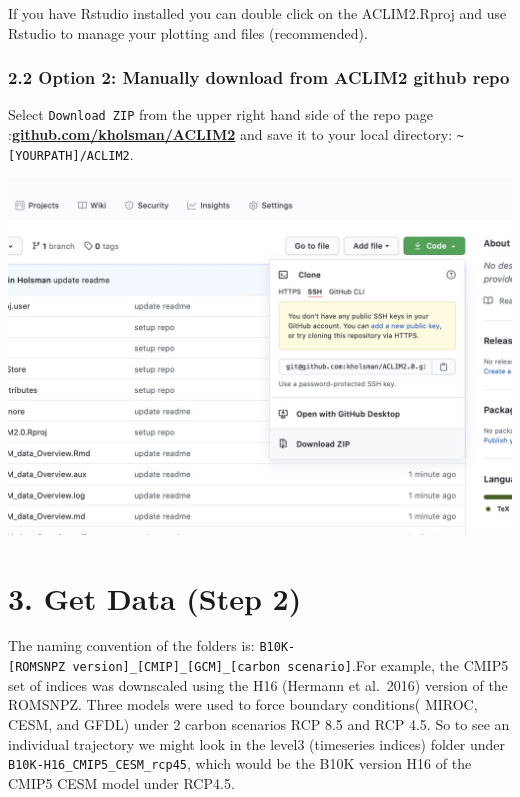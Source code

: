 \documentclass[
]{article}
\begin{document}
If you have Rstudio installed you can double click on the ACLIM2.Rproj
and use Rstudio to manage your plotting and files (recommended).

\hypertarget{option-2-manually-download-from-aclim2-github-repo}{%
\subsubsection{2.2 Option 2: Manually download from ACLIM2 github
repo}\label{option-2-manually-download-from-aclim2-github-repo}}

Select \texttt{Download\ ZIP} from the upper right hand side of the repo
page
:\href{https://github.com/kholsman/ACLIM2}{\textbf{github.com/kholsman/ACLIM2}}
and save it to your local directory:
\texttt{\textasciitilde{}{[}YOURPATH{]}/ACLIM2}.

\includegraphics[width=1\textwidth,height=\textheight]{Figs/clone.jpg}

\hypertarget{get-data-step-2}{%
\section{3. Get Data (Step 2)}\label{get-data-step-2}}

The naming convention of the folders is:
\texttt{B10K-{[}ROMSNPZ\ version{]}\_{[}CMIP{]}\_{[}GCM{]}\_{[}carbon\ scenario{]}}.For
example, the CMIP5 set of indices was downscaled using the H16 (Hermann
et al.~2016) version of the ROMSNPZ. Three models were used to force
boundary conditions( MIROC, CESM, and GFDL) under 2 carbon scenarios RCP
8.5 and RCP 4.5. So to see an individual trajectory we might look in the
level3 (timeseries indices) folder under
\texttt{B10K-H16\_CMIP5\_CESM\_rcp45}, which would be the B10K version
H16 of the CMIP5 CESM model under RCP4.5.
\end{document}
